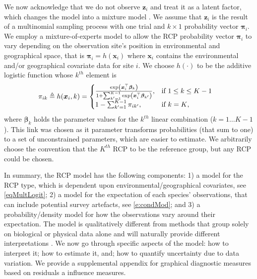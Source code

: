 \documentclass{statsoc}
\newcommand{\vz}{\bm{z}}
\newcommand{\vx}{\bm{x}}
\newcommand{\vpi}{\bm{\pi}}
\newcommand{\vb}{\bm{\beta}}
\newcommand{\ex}[1]{{\rm exp}\left(#1\right)}
\begin{document}
We now acknowledge that we do not observe $\vz_i$ and treat it as a latent factor, which changes the model into a mixture model \citep[see][]{mcl00}. We assume that $\vz_i$ is the result of a multinomial sampling process with one trial and $k\times1$ probability vector $\vpi_i$. We employ a mixture-of-experts model \citep{Jac91,mcl00} to allow the RCP probability vector $\vpi_i$ to vary depending on the observation site's position in environmental and geographical space, that is $\vpi_i=h(\vx_i)$ where $\vx_i$ contains the environmental and/or geographical covariate data for site $i$. We choose $h(\cdot)$ to be the additive logistic function \citep{ait82} whose $k^{th}$ element is
\begin{align}
	\pi_{ik}& \triangleq h(\vx_i,k)=
	    \begin{cases}
	    	\frac{\ex{\vx_i^\top\vb_k}}{1+\sum_{k'=1}^{K-1}\ex{\vx_i^\top\vb_{k'}}},&\text{if $1\leq k \leq K-1$}\\
	    	1-\sum_{k'=1}^{K-1}\pi_{ik'},&\text{if $k=K$},\label{eqMultLogit}
	    \end{cases}
\end{align}
where $\vb_k$ holds the parameter values for the $k^{th}$ linear combination ($k=1\ldots K-1$). This link was chosen as it parameter transforms probabilities (that sum to one) to a set of unconstrained parameters, which are easier to estimate. We arbitrarily choose the convention that the $K^{th}$ RCP to be the reference group, but any RCP could be chosen.

In summary, the RCP model has the following components: 1) a model for the RCP type, which is dependent upon environmental/geographical covariates, see \eqref{eqMultLogit}; 2) a model for the expectation of each species' observations, that can include potential survey artefacts, see \eqref{e:condMod}; and 3) a probability/density model for how the observations vary around their expectation. The model is qualitatively different from methods that group solely on biological or physical data alone and will naturally provide different interpretations \citep[see][for a worked example]{fos13}. We now go through specific aspects of the model: how to interpret it; how to estimate it, and; how to quantify uncertainty due to data variation. We provide a supplemental appendix for graphical diagnostic measures based on residuals a influence measures.
\end{document}

